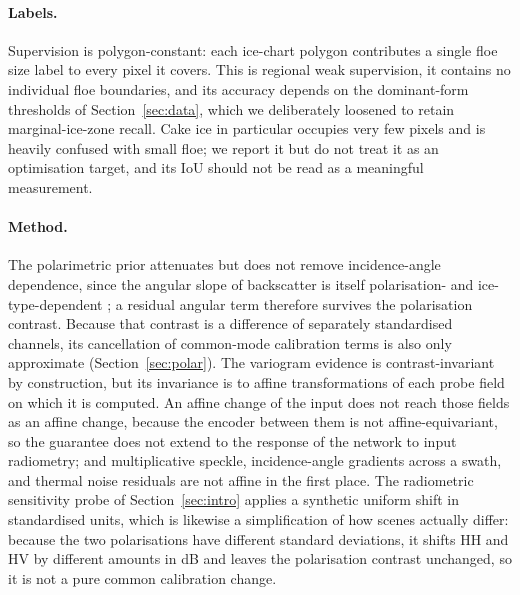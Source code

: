 \documentclass[preprint,12pt,authoryear]{elsarticle}
\begin{document}
\paragraph{Labels.} Supervision is polygon-constant: each ice-chart polygon
contributes a single floe size label to every pixel it covers. This is regional
weak supervision, it contains no individual floe boundaries, and its accuracy
depends on the dominant-form thresholds of Section~\ref{sec:data}, which we
deliberately loosened to retain marginal-ice-zone recall. Cake ice in particular
occupies very few pixels and is heavily confused with small floe; we report it
but do not treat it as an optimisation target, and its IoU should not be read as
a meaningful measurement.

\paragraph{Method.} The polarimetric prior attenuates but does not remove
incidence-angle dependence, since the angular slope of backscatter is itself
polarisation- and ice-type-dependent \citep{aldenhoff2020incidence}; a residual
angular term therefore survives the polarisation contrast. Because that
contrast is a difference of separately standardised channels, its cancellation
of common-mode calibration terms is also only approximate
(Section~\ref{sec:polar}). The variogram evidence is contrast-invariant by
construction, but its invariance is to affine transformations of each probe
field on which it is computed. An affine change of the input does not reach
those fields as an affine change, because the encoder between them is not
affine-equivariant, so the guarantee does not extend to the response of the
network to input radiometry; and multiplicative speckle, incidence-angle
gradients across a swath, and thermal noise residuals are not affine in the
first place. The radiometric sensitivity probe of Section~\ref{sec:intro}
applies a synthetic uniform shift in standardised units, which is likewise a
simplification of how scenes actually differ: because the two polarisations
have different standard deviations, it shifts HH and HV by different amounts in
dB and leaves the polarisation contrast unchanged, so it is not a pure common
calibration change.
\end{document}
